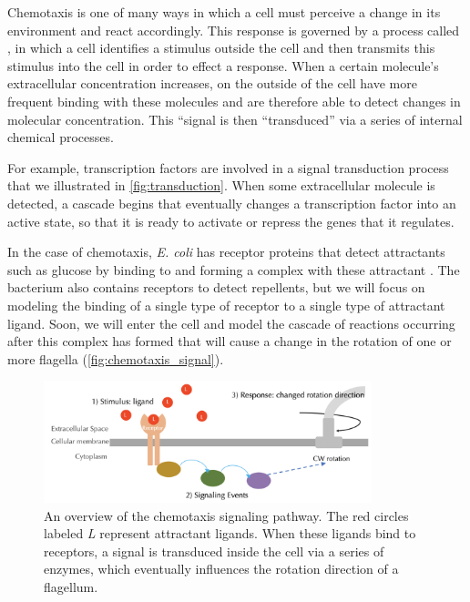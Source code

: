 Chemotaxis is one of many ways in which a cell must perceive a change in its environment and react accordingly. This response is governed by a process called , in which a cell identifies a stimulus outside the cell and then transmits this stimulus into the cell in order to effect a response. When a certain molecule's extracellular concentration increases,  on the outside of the cell have more frequent binding with these molecules and are therefore able to detect changes in molecular concentration. This ``signal is then ``transduced'' via a series of internal chemical processes.

For example, transcription factors are involved in a signal transduction process that we illustrated in \autoref{fig:transduction}. When some extracellular molecule is detected, a cascade begins that eventually changes a transcription factor into an active state, so that it is ready to activate or repress the genes that it regulates.

In the case of chemotaxis, \textit{E. coli} has receptor proteins that detect attractants such as glucose by binding to and forming a complex with these attractant . The bacterium also contains receptors to detect repellents, but we will focus on modeling the binding of a single type of receptor to a single type of attractant ligand. Soon, we will enter the cell and model the cascade of reactions occurring after this complex has formed that will cause a change in the rotation of one or more flagella (\autoref{fig:chemotaxis_signal}).\\

\begin{figure}[h]
\centering
\mySfFamily
\includegraphics[width = 0.85\textwidth]{../images/chemotaxis_signal.png}
\caption{An overview of the chemotaxis signaling pathway. The red circles labeled \textit{L} represent attractant ligands. When these ligands bind to receptors, a signal is transduced inside the cell via a series of enzymes, which eventually influences the rotation direction of a flagellum.}
\label{fig:chemotaxis_signal}
\end{figure}

